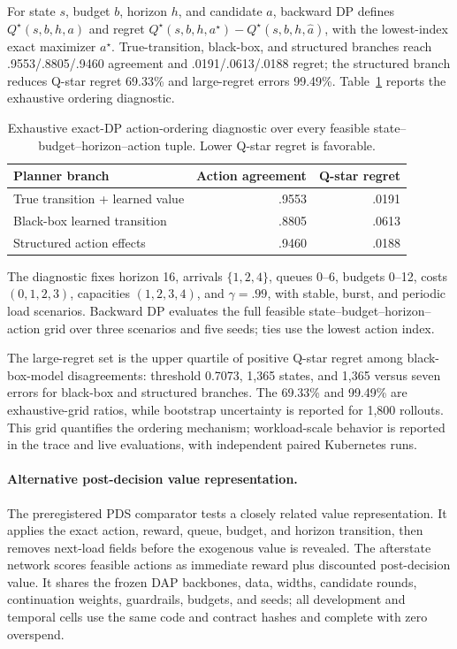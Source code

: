 \documentclass[acmsmall,screen,review,anonymous]{acmart}
\begin{document}
For state \(s\), budget \(b\), horizon \(h\), and candidate \(a\), backward DP
defines \(Q^\star(s,b,h,a)\) and regret
\(Q^\star(s,b,h,a^\star)-Q^\star(s,b,h,\hat a)\), with the lowest-index exact
maximizer \(a^\star\). True-transition, black-box, and structured branches
reach .9553/.8805/.9460 agreement and .0191/.0613/.0188 regret; the structured
branch reduces Q-star regret 69.33\% and large-regret errors 99.49\%.
Table~\ref{tab:dp} reports the exhaustive ordering diagnostic.

\begin{table}[t]
\caption{Exhaustive exact-DP action-ordering diagnostic over every feasible
state--budget--horizon--action tuple.  Lower Q-star regret is favorable.}
\label{tab:dp}
\small
\begin{tabular}{lrr}
\toprule
Planner branch & Action agreement & Q-star regret\\
\midrule
True transition + learned value & .9553 & .0191\\
Black-box learned transition & .8805 & .0613\\
Structured action effects & .9460 & .0188\\
\bottomrule
\end{tabular}
\end{table}

The diagnostic fixes horizon 16, arrivals \(\{1,2,4\}\), queues 0--6, budgets
0--12, costs \((0,1,2,3)\), capacities \((1,2,3,4)\), and \(\gamma=.99\),
with stable, burst, and periodic load scenarios. Backward DP evaluates the full
feasible state--budget--horizon--action grid over three scenarios and five seeds;
ties use the lowest action index.

The large-regret set is the upper quartile of positive Q-star regret among
black-box-model disagreements: threshold 0.7073, 1,365 states, and
1,365 versus seven errors for black-box and structured branches. The 69.33\% and
99.49\% are exhaustive-grid ratios, while bootstrap uncertainty is reported for
1,800 rollouts. This grid quantifies the ordering mechanism; workload-scale
behavior is reported in the trace and live evaluations, with independent paired
Kubernetes runs.

\paragraph{Alternative post-decision value representation.}
\label{sec:pds}

The preregistered PDS comparator tests a closely related value representation. It applies the exact
action, reward, queue, budget, and horizon transition, then removes next-load
fields before the exogenous value is revealed. The afterstate network scores
feasible actions as immediate reward plus discounted post-decision value. It
shares the frozen DAP backbones, data, widths, candidate rounds, continuation
weights, guardrails, budgets, and seeds; all development and temporal cells use
the same code and contract hashes and complete with zero overspend.
\end{document}
